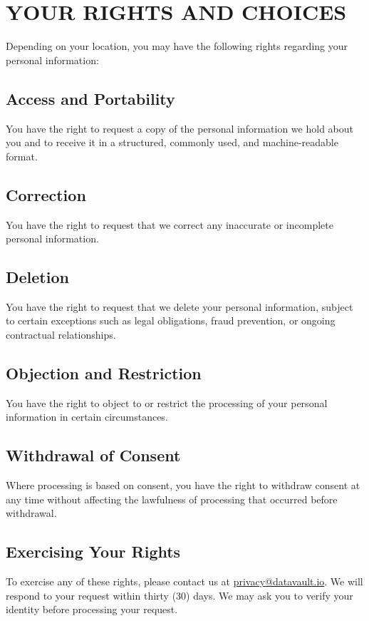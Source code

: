\documentclass[
    language=english,
    doctype=privacy-policy,
    institution=none,
]{../../omnilatex}
\begin{document}
\section{YOUR RIGHTS AND CHOICES}

Depending on your location, you may have the following rights regarding your personal information:

\subsection{Access and Portability}
You have the right to request a copy of the personal information we hold about you and to receive it in a structured, commonly used, and machine-readable format.

\subsection{Correction}
You have the right to request that we correct any inaccurate or incomplete personal information.

\subsection{Deletion}
You have the right to request that we delete your personal information, subject to certain exceptions such as legal obligations, fraud prevention, or ongoing contractual relationships.

\subsection{Objection and Restriction}
You have the right to object to or restrict the processing of your personal information in certain circumstances.

\subsection{Withdrawal of Consent}
Where processing is based on consent, you have the right to withdraw consent at any time without affecting the lawfulness of processing that occurred before withdrawal.

\subsection{Exercising Your Rights}
To exercise any of these rights, please contact us at \url{privacy@datavault.io}. We will respond to your request within thirty (30) days. We may ask you to verify your identity before processing your request.
\end{document}
